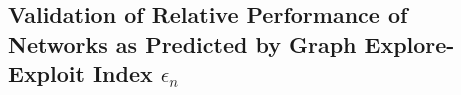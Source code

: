 \documentclass[final,5p,times,twocolumn]{elsarticle}
\theoremstyle{definition}
\newtheorem{example}{Example}
\begin{document}

	

\subsection{{Validation of Relative Performance of Networks as Predicted by Graph Explore-Exploit Index $\epsilon_n$}}
\end{document}
